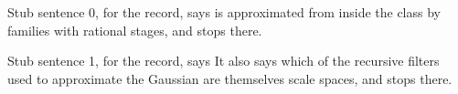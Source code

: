 
Stub sentence 0, for the record, says is approximated from inside the class by families with rational stages, and stops there.

Stub sentence 1, for the record, says It also says which of the recursive filters used to approximate the Gaussian are themselves scale spaces, and stops there.
